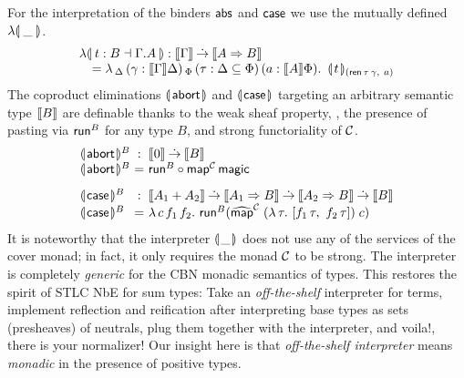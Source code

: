 \documentclass[sigplan,screen,fleqn,review]{acmart} %
\begin{document}
For the interpretation of the binders $\mathsf{abs}$ and $\mathsf{case}$ we use the
mutually defined $\fden{\_}$.
\[
\begin{array}{l}
  \fden{t : B \from \cext \Gamma A}
    : \den \Gamma \todot \den{A \To B} \\
    \quad =
      \lambda\,_\Delta\, (\gamma : \den \Gamma \Delta)
      \,_\Phi
      \,(\tau : \Delta \sublist \Phi)
      \,(a : \den A \Phi)
      .\ \,
      \dent t {(\tren\,\tau\,\gamma,\ a)} \\
\end{array}
\]
The coproduct eliminations $\llparenthesis\kern0.3ex\mathsf{abort}\kern0.3ex\rrparenthesis$ and $\llparenthesis\kern0.3ex\mathsf{case}\kern0.3ex\rrparenthesis$
targeting an arbitrary semantic type $\mathopen{{[\kern-0.14em[}} B \mathclose{{]\kern-0.14em]}}$ are definable thanks to
the weak sheaf property, \ie, the presence of pasting via $\mathsf{run}^B$
for any type $B$, and strong functoriality of $\mathcal{C}$.
\[
\begin{array}{l@{~}c@{~}l}
  \denabort^B & : & \den \tyzero \todot \den B \\
  \denabort^B & = & \trun^B \comp \tmap[\C]\,\tmagic
\\[2ex]
  \dencase^B  & : & \den{A_1 + A_2}
    \todot \den{A_1 \To B}
    \todot \den{A_2 \To B}
    \todot \den{B} \\
  \dencase^B & = & \lambda\,c\,f_1\,f_2.\
    \trun^B (\stmap[\C]\;(\lambda\,\tau.\ [f_1\,\tau,\ f_2\,\tau])\;c) \\
\end{array}
\]
It is noteworthy that the interpreter $\llparenthesis\kern0.3ex\_\kern0.3ex\rrparenthesis$ does not use any of
the services of the cover monad; in fact, it only requires the monad
$\mathcal{C}$ to be strong.  The interpreter is completely \emph{generic} for
the CBN monadic semantics of types.  This restores the spirit of STLC
NbE for sum types:  Take an \emph{off-the-shelf} interpreter for terms,
implement reflection and reification after interpreting base types as sets
(presheaves) of neutrals, plug them together with the interpreter, and
voila!, there is your normalizer!
Our insight here is that \emph{off-the-shelf interpreter} means
\emph{monadic} in the presence of positive types.
\end{document}
